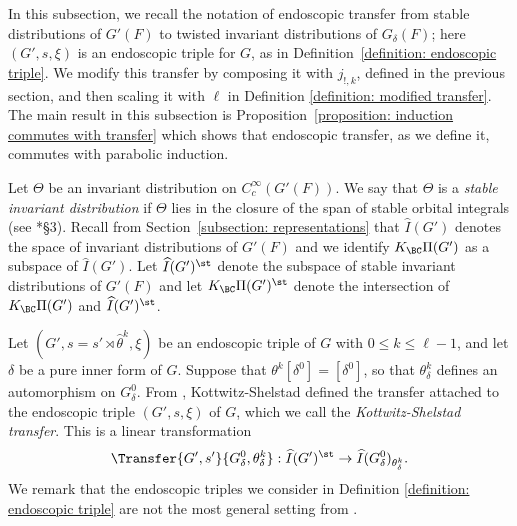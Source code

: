 \documentclass[11pt,letterpaper]{amsart}
\numberwithin{equation}{section}
\begin{document}
In this subsection, we recall the notation of endoscopic transfer from stable distributions of $G'(F)$ to twisted invariant distributions of $G_\delta(F)$; here $(G',s,\xi)$ is an endoscopic triple for $G$, as in Definition~\ref{definition: endoscopic triple}. We modify this transfer by composing it with $j_{!,k}$, defined in the previous section, and then scaling it with $\ell$ in Definition \ref{definition: modified transfer}. The main result in this subsection is Proposition~\ref{proposition: induction commutes with transfer} which shows that endoscopic transfer, as we define it, commutes with parabolic induction.

Let $\Theta$ be an invariant distribution on $C_c^\infty(G'(F))$. 
We say that $\Theta$ is a {\it stable invariant distribution} if $\Theta$ lies in the closure of the span of stable orbital integrals (see \cite{Art89}*{\S3}). 
Recall from Section~\ref{subsection: representations} that $\widehat{I}(G')$ denotes the space of invariant distributions of $G'(F)$ and we identify $K_{\BC}\Pi(G')$ as a subspace of $\widehat{I}(G')$. 
Let $\widehat{I}(G')^\st$
 denote the subspace of stable invariant distributions of $G'(F)$ and let $K_{\BC}\Pi(G')^\st$ denote the intersection of $K_{\BC}\Pi(G')$ and $\widehat{I}(G')^\st$. 

Let $(G', s =s'\rtimes \hat{\theta}^k, \xi)$ be an endoscopic triple of $G$ with $0 \leq k \leq \ell-1$, and let $\delta$ be a pure inner form of $G$. Suppose that $\theta^{k}[\delta^0]=[\delta^0]$, so that $\theta_{\delta}^k$ defines an automorphism on $G_{\delta}^0$. From \cite{KS99}, Kottwitz-Shelstad defined the transfer attached to the endoscopic triple $(G', s , \xi)$ of $G$, which we call the {\it Kottwitz-Shelstad transfer}. This is a linear transformation
\begin{equation}\label{equation: KST}
\Transfer{G',s'}{G^0_{\delta},\theta_\delta^k}: 
\widehat{I}(G')^\st 
\to 
\widehat{I}(G^0_{\delta})_{\theta_\delta^k}.
\end{equation}
We remark that the endoscopic triples we consider in Definition \ref{definition: endoscopic triple} are not the most general setting from \cite{KS99}. 
\end{document}
